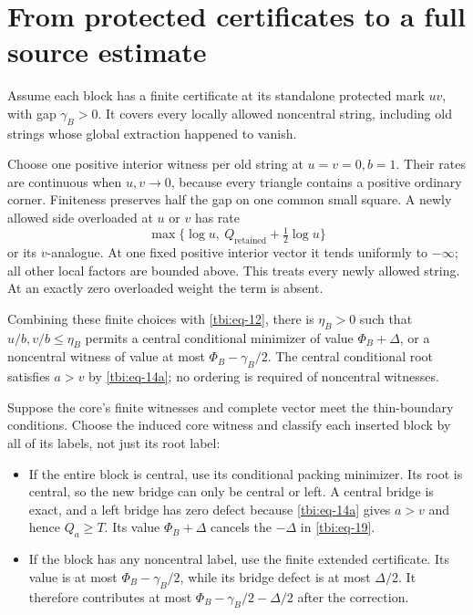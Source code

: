 \section{From protected certificates to a full source estimate}\label{tbi:sec-6}

Assume each block has a finite certificate at its standalone protected mark \(uv\), with gap \(\gamma_B>0\). It covers every locally allowed noncentral string, including old strings whose global extraction happened to vanish.

Choose one positive interior witness per old string at \(u=v=0,b=1\). Their rates are continuous when \(u,v\to0\), because every triangle contains a positive ordinary corner. Finiteness preserves half the gap on one common small square. A newly allowed side overloaded at \(u\) or \(v\) has rate
\[
\max\{\log u,\ Q_{\mathrm{retained}}+\tfrac12\log u\}
\]
or its \(v\)-analogue. At one fixed positive interior vector it tends uniformly to \(-\infty\); all other local factors are bounded above. This treats every newly allowed string. At an exactly zero overloaded weight the term is absent.

Combining these finite choices with \eqref{tbi:eq-12}, there is \(\eta_B>0\) such that \(u/b,v/b\le\eta_B\) permits a central conditional minimizer of value \(\Phi_B+\Delta\), or a noncentral witness of value at most \(\Phi_B-\gamma_B/2\). The central conditional root satisfies \(a>v\) by \eqref{tbi:eq-14a}; no ordering is required of noncentral witnesses.

Suppose the core's finite witnesses and complete vector meet the
thin-boundary conditions. Choose the induced core witness and classify
each inserted block by all of its labels, not just its root label:

\begin{itemize}
\item
  If the entire block is central, use its conditional packing minimizer. Its root is central, so the new bridge can only be central or left. A central bridge is exact, and a left bridge has zero defect because \eqref{tbi:eq-14a} gives \(a>v\) and hence \(Q_a\ge T\). Its value \(\Phi_B+\Delta\) cancels the \(-\Delta\) in \eqref{tbi:eq-19}.
\item
  If the block has any noncentral label, use the finite extended certificate. Its value is at most \(\Phi_B-\gamma_B/2\), while its bridge defect is at most \(\Delta/2\). It therefore contributes at most \(\Phi_B-\gamma_B/2-\Delta/2\) after the correction.
\end{itemize}

